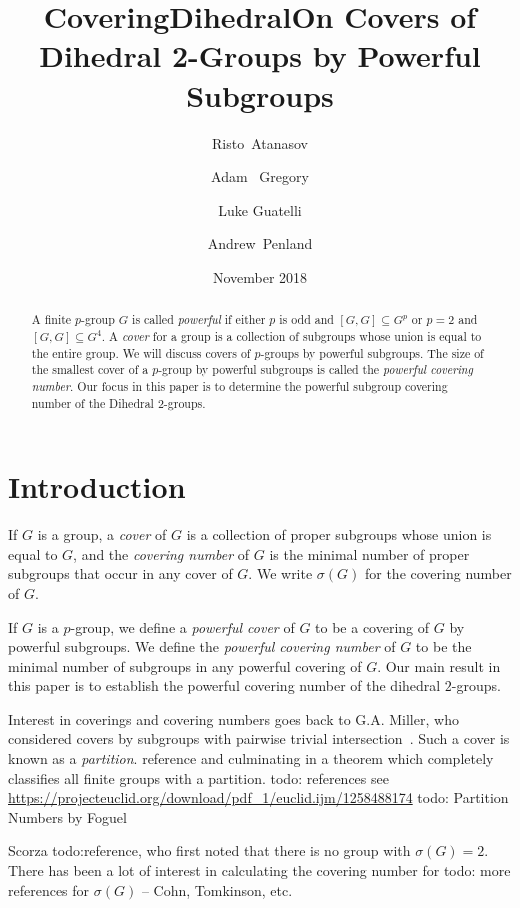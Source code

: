 \documentclass{amsart}
\title{CoveringDihedral}
\author{}
\date{November 2018}
\title[On Covers of Dihedral 2-Groups by Powerful Subgroups]
            {On Covers of Dihedral 2-Groups by Powerful Subgroups}
\author[R.~Atanasov]{Risto~Atanasov}
\author[A.~Gregory]{Adam ~Gregory}
\author[L.~Guatelli]{Luke Guatelli}
\author[A.~Penland]{Andrew~Penland}
\numberwithin{equation} {section}
\theoremstyle{definition}
\begin{document}
\maketitle

\begin{abstract}
A finite $p$-group $G$ is called \textit{powerful} if either $p$ is odd and $[G,G]\subseteq G^p$ or $p=2$ and $[G,G]\subseteq G^4$. A {\em{cover}} for a group is a collection of subgroups whose union is equal to the entire group.   We will discuss covers of $p$-groups by powerful subgroups. The size of the smallest cover of a $p$-group by powerful subgroups is called the \textit{powerful covering number}. Our focus in this paper is to determine the powerful subgroup covering number of the Dihedral 2-groups.
\end{abstract}



\maketitle

\section{Introduction}

If $G$ is a group, a \textit{cover} of $G$ is a collection of proper subgroups whose union is equal to $G$, and the \textit{covering number} of $G$ is the minimal number of proper subgroups that occur in any cover of $G$. We write $\sigma(G)$ for the covering number of $G$. 

If $G$ is a $p$-group, we define a \textit{powerful cover} of $G$ to be a covering of $G$ by powerful subgroups. We define the \textit{powerful covering number} of $G$ to be the minimal number of subgroups in any powerful covering of $G$. Our main result in this paper is to establish the powerful covering number of the dihedral $2$-groups. 

Interest in coverings and covering numbers goes back to G.A. Miller, who considered covers by subgroups with pairwise trivial intersection~\cite{}. Such a cover is known as a \textit{partition}. reference and culminating in a theorem which completely classifies all finite groups with a partition. todo: references  see \url{https://projecteuclid.org/download/pdf_1/euclid.ijm/1258488174}  todo: Partition Numbers by Foguel

Scorza todo:reference, who first noted that there is no group with $\sigma(G) = 2.$ There has been a lot of interest in calculating the covering number for  todo: more references for $\sigma(G)$ -- Cohn, Tomkinson, etc. 
\end{document}
